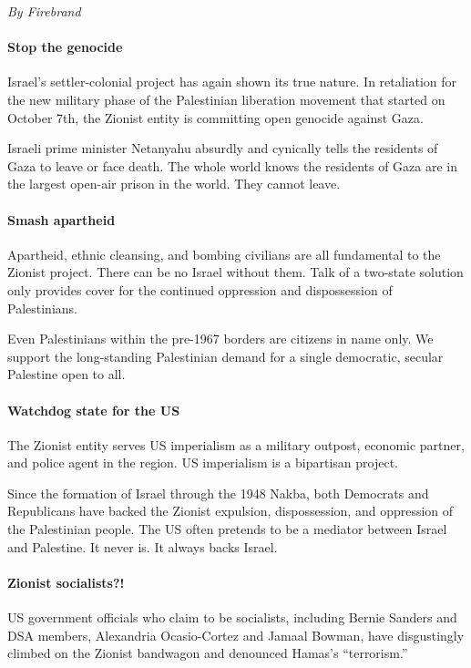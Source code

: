 \emph{By Firebrand}

\paragraph{Stop the genocide}

Israel's settler-colonial project has again shown its true nature. In retaliation for the new military phase of the Palestinian liberation movement that started on October 7th, the Zionist entity is committing open genocide against Gaza.

Israeli prime minister Netanyahu absurdly and cynically tells the residents of Gaza to leave or face death. The whole world knows the residents of Gaza are in the largest open-air prison in the world. They cannot leave.

\paragraph{Smash apartheid}

Apartheid, ethnic cleansing, and bombing civilians are all fundamental to the Zionist project. There can be no Israel without them. Talk of a two-state solution only provides cover for the continued oppression and dispossession of Palestinians.

Even Palestinians within the pre-1967 borders are citizens in name only. We support the long-standing Palestinian demand for a single democratic, secular Palestine open to all.

\paragraph{Watchdog state for the US}

The Zionist entity serves US imperialism as a military outpost, economic partner, and police agent in the region. US imperialism is a bipartisan project.

Since the formation of Israel through the 1948 Nakba, both Democrats and Republicans have backed the Zionist expulsion, dispossession, and oppression of the Palestinian people. The US often pretends to be a mediator between Israel and Palestine. It never is. It always backs Israel.

\paragraph{Zionist socialists?!}

US government officials who claim to be socialists, including Bernie Sanders and DSA members, Alexandria Ocasio-Cortez and Jamaal Bowman, have disgustingly climbed on the Zionist bandwagon and denounced Hamas's ``terrorism.''

